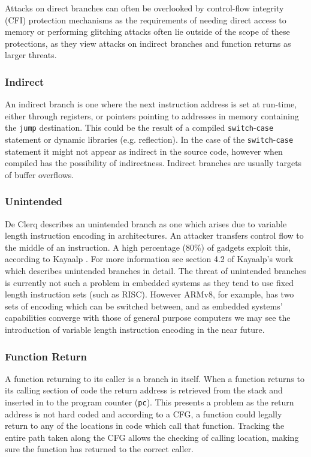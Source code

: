 Attacks on direct branches can often be overlooked by control-flow integrity (CFI) protection mechanisms as the requirements of needing direct access to memory or performing glitching attacks often lie outside of the scope of these protections, as they view attacks on indirect branches and function returns as larger threats.

\subsubsection{Indirect}
An indirect branch is one where the next instruction address is set at run-time, either through registers, or pointers pointing to addresses in memory containing the \verb|jump| destination. This could be the result of a compiled \verb|switch|-\verb|case| statement or dynamic libraries (e.g. reflection). In the case of the \verb|switch|-\verb|case| statement it might not appear as indirect in the source code, however when compiled has the possibility of indirectness. Indirect branches are usually targets of buffer overflows.

\subsubsection{Unintended}
De Clerq \cite{DeClercq2017} describes an unintended branch as one which arises due to variable length instruction encoding in architectures. An attacker transfers control flow to the middle of an instruction. A high percentage (80\%) of gadgets exploit this, according to Kayaalp \cite{Kayaalp2014}. For more information see section 4.2 of Kayaalp's work \cite{Kayaalp2014} which describes unintended branches in detail. The threat of unintended branches is currently not such a problem in embedded systems as they tend to use fixed length instruction sets (such as RISC). However ARMv8, for example, has two sets of encoding which can be switched between, and as embedded systems' capabilities converge with those of general purpose computers we may see the introduction of variable length instruction encoding in the near future.

\subsubsection{Function Return}
A function returning to its caller is a branch in itself. When a function returns to its calling section of code the return address is retrieved from the stack and inserted in to the program counter (\verb|pc|). This presents a problem as the return address is not hard coded and according to a CFG, a function could legally return to any of the locations in code which call that function. Tracking the entire path taken along the CFG allows the checking of calling location, making sure the function has returned to the correct caller.

